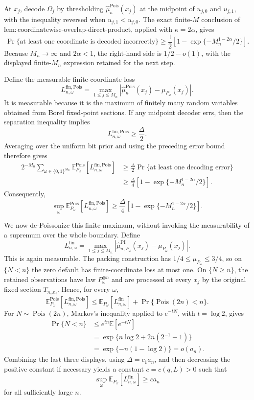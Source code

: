 At \(x_j\), decode \(\Omega_j\) by thresholding \(\widehat\mu_n^{\mathrm{Pois}}(x_j)\) at the midpoint of \(u_{j,0}\) and \(u_{j,1}\), with the inequality reversed when \(u_{j,1}<u_{j,0}\).  The exact finite-\(M\) conclusion of \(\mathrm{lem:coordinatewise\text{-}overlap\text{-}direct\text{-}product}\), applied with \(\kappa=2\alpha\), gives
\[
 \Pr\{\text{at least one coordinate is decoded incorrectly}\}
 \geq\frac12\left[1-\exp\{-M_n^{1-2\alpha}/2\}\right].
\]
Because \(M_n\to\infty\) and \(2\alpha<1\), the right-hand side is \(1/2-o(1)\), with the displayed finite-\(M_n\) expression retained for the next step.

Define the measurable finite-coordinate loss
\[
 L_{n,\omega}^{\mathrm{fin,Pois}}
 =\max_{1\leq j\leq M_n}
 \left|
 \widehat\mu_n^{\mathrm{Pois}}(x_j)-\mu_{P_\omega}(x_j)
 \right|.
\]
It is measurable because it is the maximum of finitely many random variables obtained from Borel fixed-point sections.  If any midpoint decoder errs, then the separation inequality implies
\[
 L_{n,\omega}^{\mathrm{fin,Pois}}\geq\frac{\Delta}{2}.
\]
Averaging over the uniform bit prior and using the preceding error bound therefore gives
\[
\begin{aligned}
 2^{-M_n}\sum_{\omega\in\{0,1\}^{M_n}}
 \mathbb E_{P_\omega}^{\mathrm{Pois}}
 \left[L_{n,\omega}^{\mathrm{fin,Pois}}\right]
 &\geq\frac{\Delta}{2}
 \Pr\{\text{at least one decoding error}\}\\
 &\geq\frac{\Delta}{4}
 \left[1-\exp\{-M_n^{1-2\alpha}/2\}\right].
\end{aligned}
\]
Consequently,
\[
 \sup_\omega
 \mathbb E_{P_\omega}^{\mathrm{Pois}}
 \left[L_{n,\omega}^{\mathrm{fin,Pois}}\right]
 \geq\frac{\Delta}{4}
 \left[1-\exp\{-M_n^{1-2\alpha}/2\}\right].
\]

We now de-Poissonize this finite maximum, without invoking the measurability of a supremum over the whole boundary.  Define
\[
 L_{n,\omega}^{\mathrm{fin}}
 =\max_{1\leq j\leq M_n}
 \left|
 \widehat\mu_{n,P_\omega}^{\mathrm{PI}}(x_j)
 -\mu_{P_\omega}(x_j)
 \right|.
\]
This is again measurable.  The packing construction has \(1/4\leq\mu_{P_\omega}\leq3/4\), so on \(\{N<n\}\) the zero default has finite-coordinate loss at most one.  On \(\{N\geq n\}\), the retained observations have law \(P_\omega^{\otimes n}\) and are processed at every \(x_j\) by the original fixed section \(T_{n,x_j}\).  Hence, for every \(\omega\),
\[
 \mathbb E_{P_\omega}^{\mathrm{Pois}}
 \left[L_{n,\omega}^{\mathrm{fin,Pois}}\right]
 \leq
 \mathbb E_{P_\omega}
 \left[L_{n,\omega}^{\mathrm{fin}}\right]
 +\Pr\{\operatorname{Pois}(2n)<n\}.
\]
For \(N\sim\operatorname{Pois}(2n)\), Markov's inequality applied to \(e^{-tN}\), with \(t=\log2\), gives
\[
\begin{aligned}
 \Pr\{N<n\}
 &\leq e^{tn}\mathbb E[e^{-tN}]\\
 &=\exp\{n\log2+2n(2^{-1}-1)\}\\
 &=\exp\{-n(1-\log2)\}
 =o(a_n).
\end{aligned}
\]
Combining the last three displays, using \(\Delta=c_1a_n\), and then decreasing the positive constant if necessary yields a constant \(c=c(q,L)>0\) such that
\[
 \sup_\omega
 \mathbb E_{P_\omega}
 \left[L_{n,\omega}^{\mathrm{fin}}\right]
 \geq c a_n
\]
for all sufficiently large \(n\).

